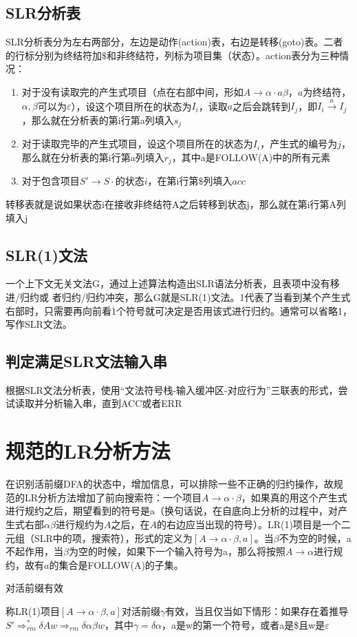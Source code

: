 \documentclass[]{report}
\begin{document}
		\subsection{SLR分析表}
		SLR分析表分为左右两部分，左边是动作(action)表，右边是转移(goto)表。二者的行标分别为终结符加$\$$和非终结符，列标为项目集（状态）。action表分为三种情况：
		\begin{enumerate}
			\item 对于没有读取完的产生式项目（点在右部中间，形如$A\to\alpha\cdot a\beta$，$a$为终结符，$\alpha,\beta$可以为$\varepsilon$），设这个项目所在的状态为$I_i$，读取$a$之后会跳转到$I_j$，即$I_i\stackrel{a}{\to}I_j$，那么就在分析表的第i行第a列填入$s_j$
			\item 对于读取完毕的产生式项目，设这个项目所在的状态为$I_i$，产生式的编号为$j$，那么就在分析表的第i行第a列填入$r_j$，其中a是FOLLOW(A)中的所有元素
			\item 对于包含项目$S'\to S\cdot$的状态$i$，在第i行第$\$$列填入$acc$
		\end{enumerate}
		转移表就是说如果状态i在接收非终结符A之后转移到状态j，那么就在第i行第A列填入j
		\subsection{SLR(1)文法}
		一个上下文无关文法G，通过上述算法构造出SLR语法分析表，且表项中没有移进/归约或 者归约/归约冲突，那么G就是SLR(1)文法。1代表了当看到某个产生式右部时，只需要再向前看1个符号就可决定是否用该式进行归约。通常可以省略1，写作SLR文法。
		\subsection{判定满足SLR文法输入串}
		根据SLR文法分析表，使用“文法符号栈-输入缓冲区-对应行为”三联表的形式，尝试读取并分析输入串，直到ACC或者ERR
	\section{规范的LR分析方法}
	在识别活前缀DFA的状态中，增加信息，可以排除一些不正确的归约操作，故规范的LR分析方法增加了前向搜索符：一个项目$A\to\alpha\cdot\beta$，如果真的用这个产生式进行规约之后，期望看到的符号是a（换句话说，在自底向上分析的过程中，对产生式右部$\alpha\beta$进行规约为$A$之后，在$A$的右边应当出现的符号）。LR(1)项目是一个二元组（SLR中的项，搜索符），形式的定义为$[A\to\alpha\cdot\beta,a]$。当$\beta$不为空的时候，a不起作用，当$\beta$为空的时候，如果下一个输入符号为a，那么将按照$A\to\alpha$进行规约，故有$a$的集合是FOLLOW(A)的子集。\par
	\begin{definition}
		对活前缀有效\par
		称LR(1)项目$[A\to\alpha\cdot\beta,a]$对活前缀$\gamma$有效，当且仅当如下情形：如果存在着推导$S'\Rightarrow^*_{rm}\delta Aw\Rightarrow_{rm}\delta\alpha\beta w$，其中$\gamma=\delta\alpha$，a是w的第一个符号，或者a是\$且w是$\varepsilon$
	\end{definition}
\end{document}
